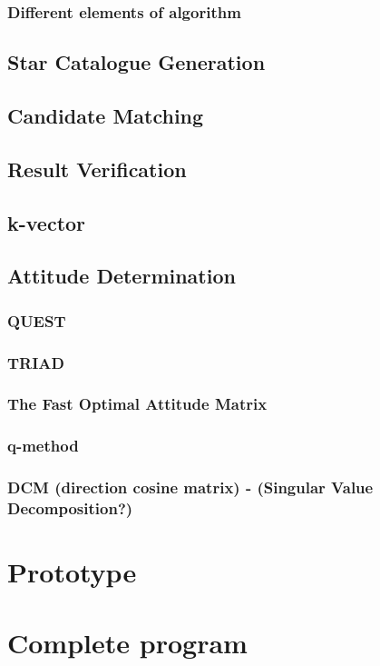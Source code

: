 \documentclass[12pt,a4paper,oneside]{article}
\begin{document}
\subsubsection{Different elements of algorithm}

\subsection{Star Catalogue Generation}
\subsection{Candidate Matching}
\subsection{Result Verification}
\subsection{k-vector}

\subsection{Attitude Determination}
\subsubsection{QUEST}
\subsubsection{TRIAD}
\subsubsection{The Fast Optimal Attitude Matrix}
\subsubsection{q-method}
\subsubsection{DCM (direction cosine matrix) - (Singular Value Decomposition?)}

\newpage
\section{Prototype}

\newpage
\section{Complete program}
\end{document}
